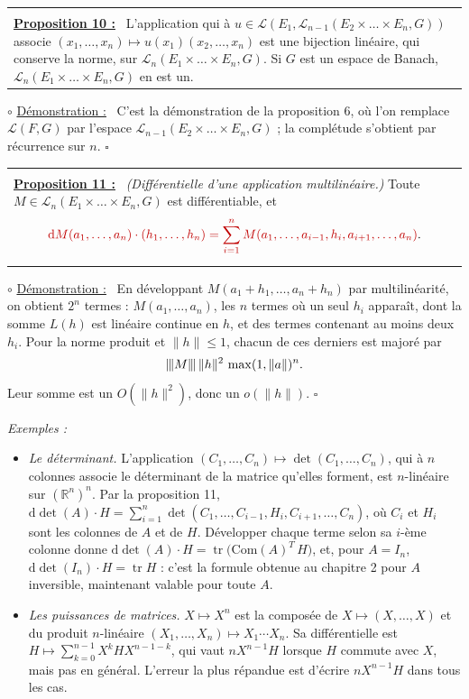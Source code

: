 \documentclass[a4paper,twoside]{report}
\makeatletter
\newcommand{\rmath}[1]{\textcolor{rougecours}{#1}}
\newenvironment{cadre}%
 {\par\vspace{2mm}\noindent\begin{tabular}{|@{\hspace{4mm}}p{0.93\textwidth}@{\hspace{4mm}}|}
  \hline \\[-2mm]}%
 {\\[2mm] \hline \end{tabular}\par\vspace{3mm}}
\newcommand{\propo}[1]{\textbf{\underline{Proposition #1 :}}~}
\newenvironment{demo}%
 {\par\needspace{4\baselineskip}\vspace{1mm}\noindent$\circ$ \underline{Démonstration :}~\setlength{\parskip}{3pt plus 1pt}}%
 {\hfill$\square$\par\vspace{2mm}}
\newenvironment{exemples}%
 {\par\needspace{6\baselineskip}\vspace{1mm}\begin{list}{}{\leftmargin=1cm \rightmargin=0.5cm}\item[]%
  \textit{Exemples :}%
  \begin{itemize}[label=$\bullet$,leftmargin=0.45cm,topsep=3pt,itemsep=4pt]}%
 {\end{itemize}\end{list}\vspace{1mm}}
\newcommand{\R}{\mathbb{R}}
\newcommand{\dd}{\mathrm{d}}                      %
\newcommand{\tr}{\operatorname{tr}}               %
\newcommand{\tra}[1]{{#1}^{T}}                    %
\newcommand{\norme}[1]{\lVert #1 \rVert}         %
\newcommand{\nop}[1]{|\mkern-1.5mu|\mkern-1.5mu|#1|\mkern-1.5mu|\mkern-1.5mu|}   %
\newcommand{\Lc}{\mathcal{L}}                     %
\makeatother
\begin{document}
\begin{cadre}
\propo{10} L'application qui à $u \in \Lc(E_{1}, \Lc_{n - 1}(E_{2} \times \dots \times E_{n}, G))$ associe $(x_{1}, \dots, x_{n}) \mapsto u(x_{1})(x_{2}, \dots, x_{n})$ est une bijection linéaire, qui conserve la norme, sur $\Lc_{n}(E_{1} \times \dots \times E_{n}, G)$. Si $G$ est un espace de Banach, $\Lc_{n}(E_{1} \times \dots \times E_{n}, G)$ en est un.
\end{cadre}

\begin{demo}
C'est la démonstration de la proposition 6, où l'on remplace $\Lc(F, G)$ par l'espace $\Lc_{n - 1}(E_{2} \times \dots \times E_{n}, G)$ ; la complétude s'obtient par récurrence sur $n$.
\end{demo}

\begin{cadre}
\propo{11} \emph{(Différentielle d'une application multilinéaire.)} Toute $M \in \Lc_{n}(E_{1} \times \dots \times E_{n}, G)$ est différentiable, et
\[ \rmath{\dd M(a_{1}, \dots, a_{n})\cdot(h_{1}, \dots, h_{n}) = \sum_{i = 1}^{n} M(a_{1}, \dots, a_{i - 1}, h_{i}, a_{i + 1}, \dots, a_{n})}. \]
\end{cadre}

\begin{demo}
En développant $M(a_{1} + h_{1}, \dots, a_{n} + h_{n})$ par multilinéarité, on obtient $2^{n}$ termes : $M(a_{1}, \dots, a_{n})$, les $n$ termes où un seul $h_{i}$ apparaît, dont la somme $L(h)$ est linéaire continue en $h$, et des termes contenant au moins deux $h_{i}$. Pour la norme produit et $\norme{h} \leqslant 1$, chacun de ces derniers est majoré par
\[ \nop{M}\,\norme{h}^{2}\,\max(1, \norme{a})^{n}. \] Leur somme est un $O(\norme{h}^{2})$, donc un $o(\norme{h})$.
\end{demo}

\begin{exemples}
  \item \emph{Le déterminant.} L'application $(C_{1}, \dots, C_{n}) \mapsto \det(C_{1}, \dots, C_{n})$, qui à $n$ colonnes associe le déterminant de la matrice qu'elles forment, est $n$-linéaire sur $(\R^{n})^{n}$. Par la proposition 11, $\dd\det(A)\cdot H = \displaystyle\sum_{i = 1}^{n} \det(C_{1}, \dots, C_{i - 1}, H_{i}, C_{i + 1}, \dots, C_{n})$, où $C_{i}$ et $H_{i}$ sont les colonnes de $A$ et de $H$. Développer chaque terme selon sa $i$-ème colonne donne $\dd\det(A)\cdot H = \tr\big(\tra{\mathrm{Com}(A)}\,H\big)$, et, pour $A = I_{n}$, $\dd\det(I_{n})\cdot H = \tr H$ : c'est la formule obtenue au chapitre 2 pour $A$ inversible, maintenant valable pour toute $A$.
  \item \emph{Les puissances de matrices.} $X \mapsto X^{n}$ est la composée de $X \mapsto (X, \dots, X)$ et du produit $n$-linéaire $(X_{1}, \dots, X_{n}) \mapsto X_{1}\cdots X_{n}$. Sa différentielle est $H \mapsto \displaystyle\sum_{k = 0}^{n - 1} X^{k}HX^{n - 1 - k}$, qui vaut $nX^{n - 1}H$ lorsque $H$ commute avec $X$, mais pas en général. L'erreur la plus répandue est d'écrire $nX^{n - 1}H$ dans tous les cas.
\end{exemples}
\end{document}
